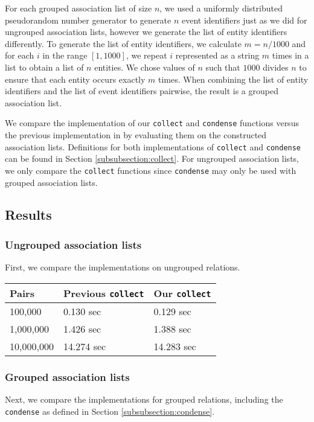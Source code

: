 \documentclass[../main.tex]{subfiles}
\begin{document}
For each grouped association list of size $n$, we used a uniformly distributed pseudorandom number generator to generate $n$ event identifiers just as we did for ungrouped association lists, however we generate the list of entity identifiers differently.  To generate the list of entity identifiers, we calculate $m = n/1000$ and for each $i$ in the range $[1, 1000]$, we repeat $i$ represented as a string $m$ times in a list to obtain a list of $n$ entities.  We chose values of $n$ such that $1000$ divides $n$ to ensure that each entity occurs exactly $m$ times.
When combining the list of entity identifiers and the list of event identifiers pairwise, the result is a grouped association list.

We compare the implementation of our \texttt{collect} and \texttt{condense} functions versus the previous implementation in \cite{agboola2015extensible} by evaluating them on the constructed association lists.  Definitions for both implementations of \texttt{collect} and \texttt{condense} can be found in Section \ref{subsubsection:collect}.  For ungrouped association lists, we only compare the \texttt{collect} functions since \texttt{condense} may only be used with grouped association lists.

\subsection{Results}

\subsubsection{Ungrouped association lists}
First, we compare the implementations on ungrouped relations.

\begin{tabular}{|l|l|l|}
	\hline
	Pairs & Previous \texttt{collect} & Our \texttt{collect} \\
	\hline
	100,000 & 0.130 sec & 0.129 sec \\
	\hline
	1,000,000 & 1.426 sec & 1.388 sec \\
	\hline
	10,000,000 & 14.274 sec & 14.283 sec \\
	\hline
\end{tabular}

\subsubsection{Grouped association lists}
Next, we compare the implementations for grouped relations, including the \texttt{condense} as defined in Section \ref{subsubsection:condense}.
\end{document}
